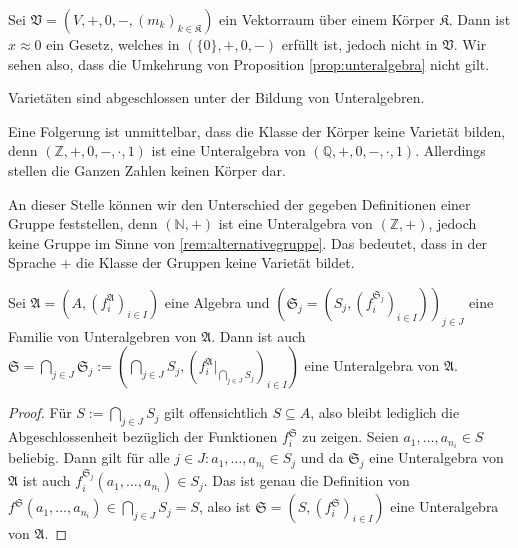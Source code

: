 \begin{remark}
    Sei $\mathfrak{V}=(V,+,0,-,(m_k)_{k\in\mathfrak{K}})$ ein Vektorraum über einem Körper $\mathfrak{K}$.
    Dann ist $x\approx 0$ ein Gesetz, welches in $(\{0\},+,0,-)$ erfüllt ist, jedoch nicht in $\mathfrak{V}$.
    Wir sehen also, dass die Umkehrung von Proposition \ref{prop:unteralgebra} nicht gilt.
\end{remark}

\begin{corollary}
    Varietäten sind abgeschlossen unter der Bildung von Unteralgebren.
\end{corollary}

\begin{remark}
    Eine Folgerung ist unmittelbar, dass die Klasse der Körper keine Varietät bilden,
    denn $(\mathbb{Z},+,0,-,\cdot,1)$ ist eine Unteralgebra von $(\mathbb{Q},+,0,-,\cdot,1)$.
    Allerdings stellen die Ganzen Zahlen keinen Körper dar.
\end{remark}

\begin{remark}
    An dieser Stelle können wir den Unterschied der gegeben Definitionen einer Gruppe feststellen,
    denn $(\mathbb{N},+)$ ist eine Unteralgebra von $(\mathbb{Z},+)$, jedoch keine Gruppe im Sinne von 
    \cref{rem:alternativegruppe}. Das bedeutet, dass in der Sprache $+$ die Klasse der Gruppen keine Varietät bildet.
\end{remark}

\vspace*{-\lineskip}

\begin{proposition}
    Sei $\mathfrak{A}=(A,(f^\mathfrak{A}_i)_{i\in I})$ eine Algebra und $(\mathfrak{S}_j = (S_j, (f_i^{\mathfrak{S}_j})_{i \in I}))_{j\in J}$ eine Familie von Unteralgebren
    von $\mathfrak{A}$. Dann ist auch $\mathfrak{S} = \bigcap_{j \in J} \mathfrak{S}_j := (\bigcap_{j\in J}S_j,(f^\mathfrak{A}_i\vert_{\bigcap_{j\in J}S_j})_{i\in I})$ eine Unteralgebra von $\mathfrak{A}$.
\end{proposition}

\begin{proof}
    Für $S:=\bigcap_{j\in J}S_j$ gilt offensichtlich $S\subseteq A$, also bleibt lediglich die Abgeschlossenheit bezüglich
    der Funktionen $f^\mathfrak{S}_i$ zu zeigen. Seien $a_1,\ldots,a_{n_i}\in S$ beliebig. Dann gilt für alle
    $j\in J:a_1,\ldots,a_{n_i}\in S_j$ und da $\mathfrak{S}_j$ eine Unteralgebra von $\mathfrak{A}$ ist auch $f^{\mathfrak{S}_j}_i(a_1,\ldots,a_{n_i})\in S_j$.
    Das ist genau die Definition von $f^\mathfrak{S}(a_1,\ldots,a_{n_i})\in \bigcap_{j\in J}S_j=S$, also ist $\mathfrak{S}=(S,(f^\mathfrak{S}_i)_{i\in I})$ eine Unteralgebra von $\mathfrak{A}$.
\end{proof}

